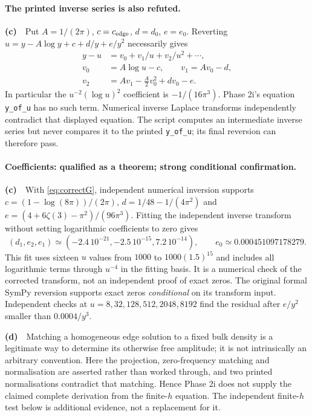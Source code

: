 \documentclass[11pt,a4paper]{article}
\newcommand{\Lc}{\textbf{(c)}\ }
\newcommand{\Ld}{\textbf{(d)}\ }
\begin{document}
\paragraph{The printed inverse series is also refuted.}
\Lc\ Put $A=1/(2\pi)$, $c=c_{\rm edge}$, $d=d_0$, $e=e_0$.
Reverting $u=y-A\log y+c+d/y+e/y^2$ necessarily gives
\begin{align}
 y-u&=v_0+v_1/u+v_2/u^2+\cdots,\\
 v_0&=A\log u-c,\qquad v_1=Av_0-d,\nonumber\\
 v_2&=Av_1-\tfrac A2v_0^2+dv_0-e.\label{eq:inverse}
\end{align}
In particular the $u^{-2}(\log u)^2$ coefficient is $-1/(16\pi^3)$.
Phase 2i's equation \texttt{y\_of\_u} has no such term. Numerical inverse
Laplace transforms independently contradict that displayed equation.
The script computes an intermediate inverse series but never compares it to
the printed \texttt{y\_of\_u}; its final reversion can therefore pass.

\paragraph{Coefficients: qualified as a theorem; strong conditional confirmation.}
\Lc\ With \eqref{eq:correctG}, independent numerical inversion supports
$c=(1-\log(8\pi))/(2\pi)$,
$d=1/48-1/(4\pi^2)$ and
$e=(4+6\zeta(3)-\pi^2)/(96\pi^3)$.
Fitting the independent inverse transform without setting logarithmic
coefficients to zero gives
\[
 (d_1,e_2,e_1)\simeq(-2.4\,10^{-21},-2.5\,10^{-15},7.2\,10^{-14}),
 \qquad e_0\simeq0.000451097178279.
\]
This fit uses sixteen $u$ values from $1000$ to $1000(1.5)^{15}$ and includes
all logarithmic terms through $u^{-4}$ in the fitting basis. It is a numerical
check of the corrected transform, not an independent proof of exact zeros.
The original formal SymPy reversion supports exact zeros \emph{conditional}
on its transform input. Independent checks at $u=8,32,128,512,2048,8192$
find the residual after $e/y^2$ smaller than $0.0004/y^3$.

\Ld\ Matching a homogeneous edge solution to a fixed bulk density is a
legitimate way to determine its otherwise free amplitude; it is not intrinsically
an arbitrary convention. Here the projection, zero-frequency matching and
normalisation are asserted rather than worked through, and two printed
normalisations contradict that matching. Hence Phase 2i does not supply the
claimed complete derivation from the finite-$h$ equation. The independent
finite-$h$ test below is additional evidence, not a replacement for it.
\end{document}
